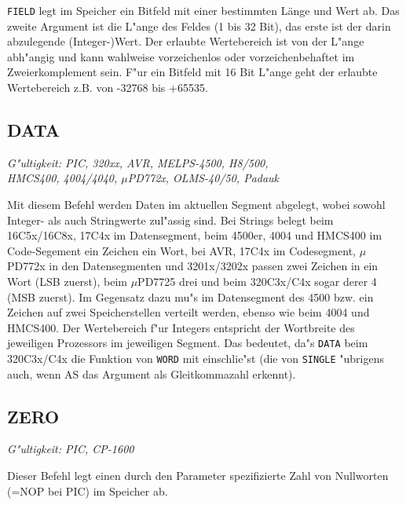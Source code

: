\documentclass[12pt,a4paper,twoside]{report}
\makeatletter
\newcommand{\tty}[1]{{\tt #1}}
\newcommand{\ttindex}[1]{\index{#1@{\tt #1}}}
\newcommand{\asname}{AS}
\makeatother
\begin{document}
\tty{FIELD} legt im Speicher ein Bitfeld mit einer bestimmten Länge und Wert
ab.  Das zweite Argument ist die L"ange des Feldes (1 bis 32 Bit), das erste
ist der darin abzulegende (Integer-)Wert.  Der erlaubte Wertebereich ist von
der L"ange abh"angig und kann wahlweise vorzeichenlos oder vorzeichenbehaftet
im Zweierkomplement sein.  F"ur ein Bitfeld mit 16 Bit L"ange geht der erlaubte
Wertebereich z.B. von -32768 bis +65535.


\subsection{DATA}
\ttindex{DATA}

{\em G"ultigkeit: PIC, 320xx, AVR, MELPS-4500, H8/500, \\
     HMCS400, 4004/4040, $\mu$PD772x, OLMS-40/50, Padauk}

Mit diesem Befehl werden Daten im aktuellen Segment abgelegt,
wobei sowohl Integer- als auch Stringwerte zul"assig sind.  Bei
Strings belegt beim 16C5x/16C8x, 17C4x im Datensegment, beim
4500er, 4004 und HMCS400 im Code-Segement ein Zeichen ein Wort,
bei AVR, 17C4x im Codesegment, $\mu$PD772x in den Datensegmenten
und 3201x/3202x passen zwei Zeichen in ein Wort (LSB zuerst),
beim $\mu$PD7725 drei und beim 320C3x/C4x sogar derer 4 (MSB
zuerst).  Im Gegensatz dazu mu"s im Datensegment des 4500 bzw.
ein Zeichen auf zwei Speicherstellen verteilt werden, ebenso wie
beim 4004 und HMCS400.  Der Wertebereich f"ur Integers entspricht
der Wortbreite des jeweiligen Prozessors im jeweiligen Segment.
Das bedeutet, da"s \tty{DATA} beim 320C3x/C4x die Funktion von
\tty{WORD} mit einschlie"st (die von \tty{SINGLE} "ubrigens auch,
wenn \asname{} das Argument als Gleitkommazahl erkennt).


\subsection{ZERO}
\ttindex{ZERO}

{\em G"ultigkeit: PIC, CP-1600}

Dieser Befehl legt einen durch den Parameter spezifizierte
Zahl von Nullworten (=NOP bei PIC) im Speicher ab.

\end{document}

